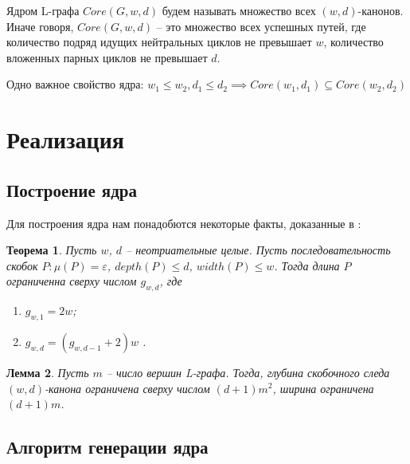 \documentclass{article}
\newtheorem{theorem}{Теорема}[section]
\newtheorem{lemma}[theorem]{Лемма}
\begin{document}
Ядром L-графа $Core(G, w, d)$ будем называть множество всех $(w,d)$-канонов. 
Иначе говоря, $Core(G, w, d)$ -- это множество всех успешных путей, 
где количество подряд идущих нейтральных циклов не превышает  $w$, 
количество вложенных парных циклов не превышает $d$.  

Одно важное свойство ядра: $w_1 \leq w_2, d_1 \leq d_2 \implies Core(w_1, d_1) \subseteq Core(w_2, d_2)$

\section{Реализация}

\subsection{Построение ядра}
Для построения ядра нам понадобются некоторые факты, доказанные в :

\begin{theorem}
    \label{canon_length_limit_theorem}
    Пусть $w$, $d$ -- неотриательные целые. Пусть последовательность скобок $P : \mu(P)=\varepsilon$, $depth(P) \leq d$, $width(P) \leq w$. 
    Тогда длина $P$ ограниченна сверху числом $g_{w,d}$, где 
    \begin{enumerate}
        \item $g_{w,1} = 2w$;
        \item $g_{w,d} = (g_{w,d-1} + 2)w$ .
    \end{enumerate}
\end{theorem}
\begin{lemma}
    \label{wd_upper_limit_lemma}
    Пусть $m$ -- число вершин L-графа. Тогда, глубина скобочного следа $(w,d)$-канона ограничена сверху числом $(d+1)m^2$, ширина ограничена $(d+1)m$.
\end{lemma}

\subsection*{Алгоритм генерации ядра}
\end{document}
